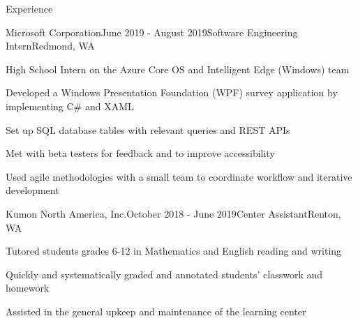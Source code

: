 \documentclass{resume} %
\begin{document}

\begin{rSection}{Experience}

\begin{rSubsection}{Microsoft Corporation}{June 2019 - August 2019}{Software Engineering Intern}{Redmond, WA}
\item High School Intern on the Azure Core OS and Intelligent Edge (Windows) team
\item Developed a Windows Presentation Foundation (WPF) survey application by implementing C\# and XAML
\item Set up SQL database tables with relevant queries and REST APIs
\item Met with beta testers for feedback and to improve accessibility
\item Used agile methodologies with a small team to coordinate workflow and iterative development
\end{rSubsection}


\begin{rSubsection}{Kumon North America, Inc.}{October 2018 - June 2019}{Center Assistant}{Renton, WA}
\item Tutored students grades 6-12 in Mathematics and English reading and writing
\item Quickly and systematically graded and annotated students' classwork and homework
\item Assisted in the general upkeep and maintenance of the learning center
\end{rSubsection}

\end{rSection}

\end{document}
